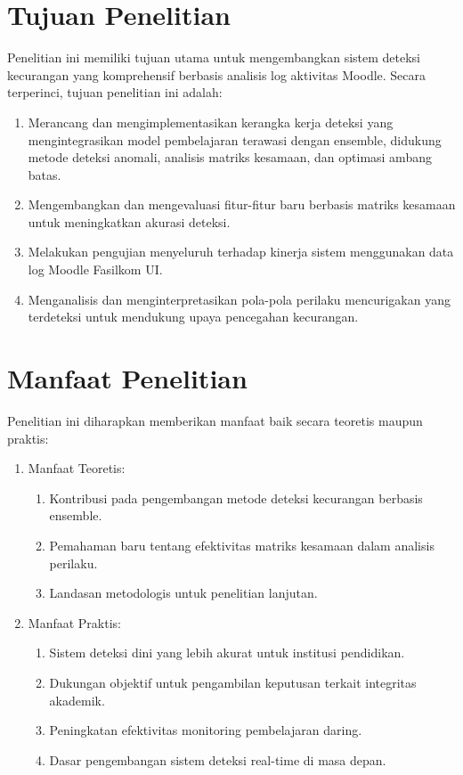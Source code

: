 \section{Tujuan Penelitian}
\label{sec:tujuan}
Penelitian ini memiliki tujuan utama untuk mengembangkan sistem deteksi kecurangan yang komprehensif berbasis analisis log aktivitas Moodle. Secara terperinci, tujuan penelitian ini adalah:
\begin{enumerate}
    \item Merancang dan mengimplementasikan kerangka kerja deteksi yang mengintegrasikan model pembelajaran terawasi dengan ensemble, didukung metode deteksi anomali, analisis matriks kesamaan, dan optimasi ambang batas.
    \item Mengembangkan dan mengevaluasi fitur-fitur baru berbasis matriks kesamaan untuk meningkatkan akurasi deteksi.
    \item Melakukan pengujian menyeluruh terhadap kinerja sistem menggunakan data log Moodle Fasilkom UI.
    \item Menganalisis dan menginterpretasikan pola-pola perilaku mencurigakan yang terdeteksi untuk mendukung upaya pencegahan kecurangan.
\end{enumerate}

\section{Manfaat Penelitian}
\label{sec:manfaat}
Penelitian ini diharapkan memberikan manfaat baik secara teoretis maupun praktis:
\begin{enumerate}
    \item Manfaat Teoretis:
    \begin{enumerate}
        \item Kontribusi pada pengembangan metode deteksi kecurangan berbasis ensemble.
        \item Pemahaman baru tentang efektivitas matriks kesamaan dalam analisis perilaku.
        \item Landasan metodologis untuk penelitian lanjutan.
    \end{enumerate}
    
    \item Manfaat Praktis:
    \begin{enumerate}
        \item Sistem deteksi dini yang lebih akurat untuk institusi pendidikan.
        \item Dukungan objektif untuk pengambilan keputusan terkait integritas akademik.
        \item Peningkatan efektivitas monitoring pembelajaran daring.
        \item Dasar pengembangan sistem deteksi real-time di masa depan.
    \end{enumerate}
\end{enumerate}

